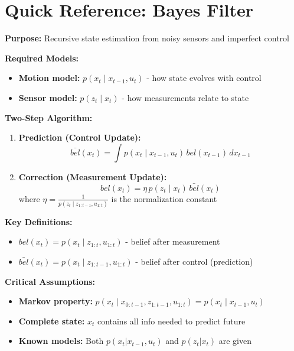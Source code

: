 
\section{Quick Reference: Bayes Filter}

\begin{tcolorbox}[colback=yellow!10!white,colframe=orange!75!black,title=\textbf{Bayes Filter - Fast Reference}]
\textbf{Purpose:} Recursive state estimation from noisy sensors and imperfect control

\vspace{2mm}
\textbf{Required Models:}
\begin{itemize}
    \item \textbf{Motion model:} $p(x_t \mid x_{t-1}, u_t)$ - how state evolves with control
    \item \textbf{Sensor model:} $p(z_t \mid x_t)$ - how measurements relate to state
\end{itemize}

\vspace{2mm}
\textbf{Two-Step Algorithm:}
\begin{enumerate}
    \item \textbf{Prediction (Control Update):} 
    $$\bar{bel}(x_t) = \int p(x_t \mid x_{t-1}, u_t) \, bel(x_{t-1}) \, dx_{t-1}$$
    
    \item \textbf{Correction (Measurement Update):} 
    $$bel(x_t) = \eta \, p(z_t \mid x_t) \, \bar{bel}(x_t)$$
    where $\eta = \frac{1}{p(z_t \mid z_{1:t-1}, u_{1:t})}$ is the normalization constant
\end{enumerate}

\vspace{2mm}
\textbf{Key Definitions:}
\begin{itemize}
    \item $bel(x_t) = p(x_t \mid z_{1:t}, u_{1:t})$ - belief after measurement
    \item $\bar{bel}(x_t) = p(x_t \mid z_{1:t-1}, u_{1:t})$ - belief after control (prediction)
\end{itemize}

\vspace{2mm}
\textbf{Critical Assumptions:}
\begin{itemize}
    \item \textbf{Markov property:} $p(x_t \mid x_{0:t-1}, z_{1:t-1}, u_{1:t}) = p(x_t \mid x_{t-1}, u_t)$
    \item \textbf{Complete state:} $x_t$ contains all info needed to predict future
    \item \textbf{Known models:} Both $p(x_t|x_{t-1},u_t)$ and $p(z_t|x_t)$ are given
\end{itemize}
\end{tcolorbox}

